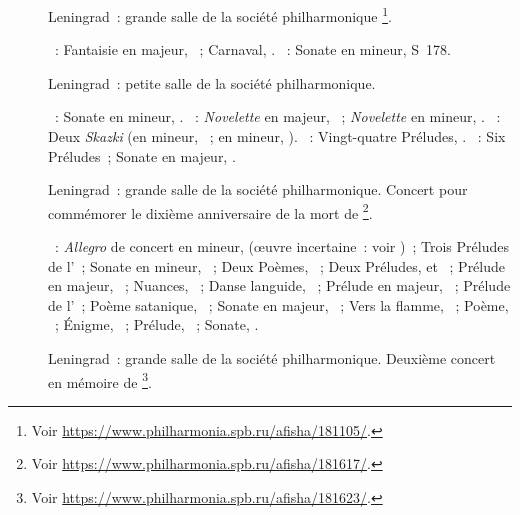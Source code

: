 \begin{description}
 \item[]
 Leningrad~: grande salle de la société philharmonique%
 \footnote{Voir \href{https://www.philharmonia.spb.ru/afisha/181105/}%
 {https://www.philharmonia.spb.ru/afisha/181105/}.}.

 \textsc{\Schumann{}}~: Fantaisie en \kC majeur, ~; Carnaval,
 .
 \textsc{\Liszt{}}~: Sonate en \kB mineur, S~178.
 \item[]
 Leningrad~: petite salle de la société philharmonique.

 \textsc{\Beethoven{}}~: Sonate en \kC \Sharp mineur,  .
 \textsc{\Schumann{}}~: \emph{Novelette} en \kE majeur, 
 ~; \emph{Novelette} en \kF \Sharp mineur,  .
 \textsc{\Medtner{}}~: Deux \emph{Skazki} (en \kB \Flat mineur, 
 ~; en \kB mineur,  ).
 \textsc{\Chopin{}}~: Vingt-quatre Préludes, .
 \textsc{\Scriabine{}}~: Six Préludes~; Sonate en \kF \Sharp majeur,
 .
 \item[]
 Leningrad~: grande salle de la société philharmonique.
 Concert pour commémorer le dixième anniversaire de la mort de \Scriabine{}%
 \footnote{Voir \href{https://www.philharmonia.spb.ru/afisha/181617/}%
 {https://www.philharmonia.spb.ru/afisha/181617/}.}.

 \textsc{\Scriabine{}}~: \emph{Allegro} de concert en \kB \Flat mineur,
  (œuvre incertaine~: voir \citet[p.~396]{Scriabine})~; Trois
 Préludes de l'~; Sonate en \kF \Sharp mineur, ~; Deux
 Poèmes, ~; Deux Préludes,   et ~;
 Prélude en \kF majeur,  ~; Nuances, 
 ~; Danse languide,  ~; Prélude en \kE majeur,
  ~; Prélude de l'~; Poème satanique,
 ~; Sonate en \kF \Sharp majeur, ~; Vers la flamme,
 ~; Poème,  ~; Énigme,  ~;
 Prélude,  ~; Sonate, .
 \item[]
 Leningrad~: grande salle de la société philharmonique.
 Deuxième concert en mémoire de \Scriabine{}%
 \footnote{Voir \href{https://www.philharmonia.spb.ru/afisha/181623/}%
 {https://www.philharmonia.spb.ru/afisha/181623/}.}.


\end{description}

